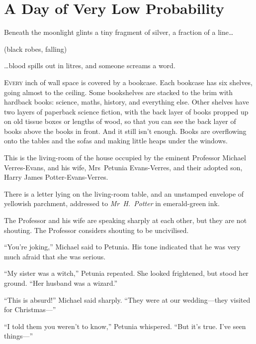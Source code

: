 \chapter{A Day of Very Low Probability}

\begin{chapterOpeningQuote}
\noindent
Beneath the moonlight glints a tiny fragment of silver, a fraction of a line…

\vspace*{2ex}
(black robes, falling)

\vspace*{2ex}
…blood spills out in litres, and someone screams a word.
\end{chapterOpeningQuote}

\lettrine{E}{very} inch of wall space is covered by a bookcase. Each bookcase has six shelves, going almost to the ceiling. Some bookshelves are stacked to the brim with hardback books: science, maths, history, and everything else. Other shelves have two layers of paperback science fiction, with the back layer of books propped up on old tissue boxes\footnotemark{} or lengths of wood, so that you can see the back layer of books above the books in front. And it still isn’t enough. Books are overflowing onto the tables and the sofas and making little heaps under the windows.

This is the living-room of the house occupied by the eminent Professor Michael Verres-Evans, and his wife, Mrs~Petunia Evans-Verres, and their adopted son, Harry James Potter-Evans-Verres.

There is a letter lying on the living-room table, and an unstamped envelope of yellowish parchment, addressed to \emph{Mr~H.~Potter} in emerald-green ink.

The Professor and his wife are speaking sharply at each other, but they are not shouting. The Professor considers shouting to be uncivilised.

“You’re joking,” Michael said to Petunia. His tone indicated that he was very much afraid that she was serious.

“My sister was a witch,” Petunia repeated. She looked frightened, but stood her ground. “Her husband was a wizard.”

“This is absurd!” Michael said sharply. “They were at our wedding—they visited for Christmas—”

“I told them you weren’t to know,” Petunia whispered. “But it’s true. I’ve seen things—”

